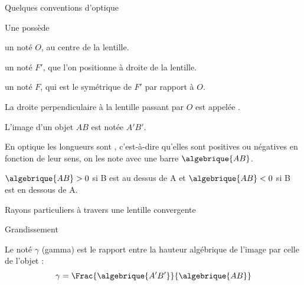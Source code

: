 \begin{doc}{Quelques conventions d'optique}
  \label{doc:convention_optique}
  \vspace{-24pt}
  \begin{encart}
    Une  possède
    \begin{listePoints}
      \item un  noté $O$, au centre de la lentille. 
      \item un  noté $F'$, que l'on positionne à droite de la lentille.
      \item un  noté $F$, qui est le symétrique de $F'$ par rapport à $O$.
    \end{listePoints}
  \end{encart}
  
  La droite perpendiculaire à la lentille passant par $O$ est appelée .
  
  L'image d'un objet $AB$ est notée $A'B'$.
  \begin{encart}
    En optique les longueurs sont , c'est-à-dire qu'elles sont positives ou négatives en fonction de leur sens, on les note avec une barre $\algebrique{AB}$.
  \end{encart}
  \exemple $\algebrique{AB} > 0$ si B est au dessus de A et $\algebrique{AB} < 0$ si B est en dessous de A.
\end{doc}

\begin{doc}{Rayons particuliers à travers une lentille convergente}
  \label{doc:rayons_lentille}
  \centering
\end{doc}

\begin{doc}{Grandissement}
  \label{doc:grandissement}
  \vspace*{-24pt}
  \begin{encart}
    Le  noté $\gamma$ (gamma) est le rapport entre la hauteur algébrique de l'image par celle de l'objet :
    \begin{equation*}
        \gamma = \Frac{\algebrique{A'B'}}{\algebrique{AB}}
    \end{equation*}
  \end{encart}
\end{doc}

